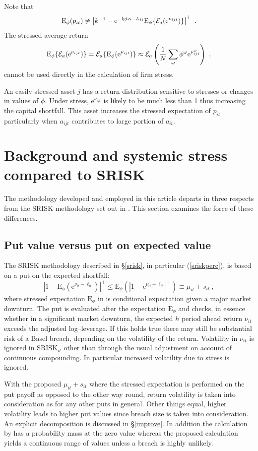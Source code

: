 \documentclass[12pt]{article}
\newcommand{\logit}{\mathrm{lgt}}
\newcommand{\E}{\mathrm{E}}
\newcommand{\e}{\mathrm{e}}
\renewcommand{\o}{\omega}
\newcommand{\Ex}{{\cal E}}
\newcommand{\Es}{\E_\phi}
\newcommand{\eref}[1]{(\ref{#1})}
\newcommand{\sref}[1]{\S\ref{#1}}
\newcommand{\be}[1]{\begin{equation}\label{#1}}
\newcommand{\ee}{\end{equation}}
\begin{document}
Note that
$$
\Es(p_{it}) \ne \left|k^{-1}-\e^{-\logit\kappa-L_{it}}\Es\{\Ex_a(\e^{\nu_{ijt}})\}\right|^+\ .
$$
The stressed average return
$$
\Es\{\Ex_a(\e^{\nu_{ijt}})\} = \Ex_a\{\Es(\e^{\nu_{ijt}})\} \approx \Ex_a\left( \frac{1}{N}\sum_\o\phi^\o\e^{\nu_{ijt}^\o}\right)\ ,
$$
cannot be used directly in the calculation of firm stress.

An easily stressed asset $j$  has a return distribution sensitive to stresses or changes in values of $\phi$. Under stress, $\e^{\nu_{ijt}}$ is likely to be much less than 1 thus increasing the capital shortfall. This asset increases the stressed expectation of $p_{it}$ particularly when $a_{ijt}$ contributes to large portion of $a_{it}$.







\section{Background and systemic stress  compared to SRISK}\label{comparison}

The methodology developed and employed in this article departs in three respects from the SRISK methodology set out in \cite{brownlees2015}.  This section examines the force of these differences.

\subsection{Put value versus put on expected value}

The SRISK methodology described in \sref{srisk}, in particular \eref{sriskperc}, is based on a put on the expected shortfall:
\be{prisk}
 |1-\E_\phi(\e^{\nu_{it}-\ell_{it}})|^+\le \Es(|1-\e^{\nu_{it}-\ell_{it}}|^+) \equiv \mu_{it}+s_{it}\ ,
\ee
where stressed expectation $\Es$ in \cite{brownlees2015} is conditional expectation given a major market downturn.  The   put is evaluated after the expectation $\Es$ and checks, in essence whether in a significant market downturn, the expected $h$ period ahead return $\nu_{it}$ exceeds the adjusted   log--leverage.  If this holds true there may still be substantial risk of a Basel breach, depending on the volatility of the return.   Volatility in $\nu_{it}$ is ignored in  $\mathrm{SRISK}_{it}$  other than through the usual adjustment on account of continuous compounding.  In particular increased volatility due to stress is ignored.

With the proposed $\mu_{it}+s_{it}$ where the stressed expectation is performed on the put payoff as opposed to the other way round, return volatility is taken into consideration as for any other puts in general. Other things equal, higher volatility leads to higher put values since breach size is taken into consideration. An explicit decomposition is discussed in \sref{improve}. In addition the calculation by \cite{brownlees2015} has a probability mass at the zero value whereas the proposed calculation yields a continuous range of values unless a breach is highly unlikely.
\end{document}
